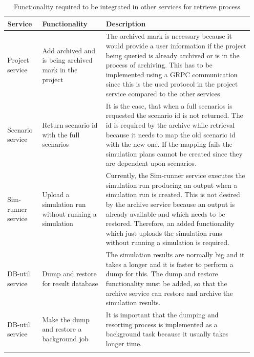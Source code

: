     \begin{longtable}{|p{2cm}|p{6cm}|p{6cm}|}
        \hline
            \textbf{Service}  & \textbf{Functionality} & \textbf{Description}\\
        \hline
            Project service & Add archived and is being archived mark in the project &  The archived mark is necessary because
            it would provide a user information if the project being queried is already archived or is in the process of archiving. This has to be
            implemented using a GRPC communication since this is the used protocol in the project service compared to the other services.  \\
        \hline
            Scenario service & Return scenario id with the full scenarios & It is the case, that when a full scenarios is requested the scenario id is
            not returned. The id is required by the archive while retrieval because it needs to map the old scenario id with the new one. If the mapping
            fails the simulation plans cannot be created since they are dependent upon scenarios.\\
        \hline
            Sim-runner service & Upload a simulation run without running a simulation & Currently, the Sim-runner service executes the simulation run producing an
            output when a simulation run is created. This is not desired by the archive service because an output is already available and which needs to be restored. Therefore, an added 
            functionality which just uploads the simulation runs without running a simulation is required.\\
        \hline
            DB-util service & Dump and restore for result database & The simulation results are normally big and it takes a longer and it is faster to
            perform a dump for this. The dump and restore functionality must be added, so that the archive service can restore and archive the simulation results.\\
        \hline
            DB-util service & Make the dump and restore a background job & It is important that the dumping and resorting process is implemented as a background task
            because it usually takes longer time.\\

        \hline
        \caption{Functionality required to be integrated in other services for retrieve process}
        \label{table:funcRestore} 
    \end{longtable}

